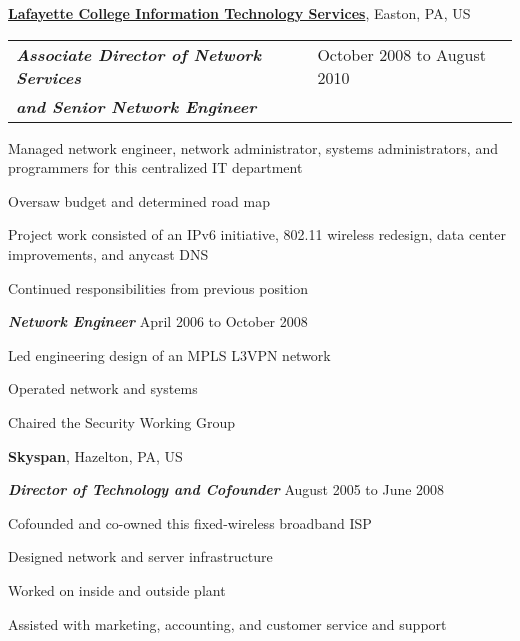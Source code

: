 \documentclass[10pt]{article}
\newenvironment{outerlist}[1][\enskip\textbullet]%
        {\begin{itemize}[#1]}{\end{itemize}%
         \vspace{-.6\baselineskip}}
\newenvironment{innerlist}[1][\enskip\textbullet]%
        {\begin{compactitem}[#1]}{\end{compactitem}}
\newcommand{\blankline}{\quad\pagebreak[2]}
\begin{document}
\href{https://its.lafayette.edu}{\textbf{Lafayette College Information Technology Services}},
Easton, PA, US
\begin{outerlist}
\item[]
  \newlength{\rcoltitlelength}\setlength{\rcoltitlelength}{2.16in}
  \begin{tabular}[t]{@{}p{\textwidth-\rcoltitlelength} p{\rcoltitlelength}}
    \textit{\textbf{Associate Director of Network Services }} &
    October 2008 to August 2010 \\
    \textit{\textbf{and Senior Network Engineer}} & \\
  \end{tabular}
  \begin{innerlist}
  \item Managed network engineer, network administrator, systems administrators, and programmers for this centralized IT department
  \item Oversaw budget and determined road map
  \item Project work consisted of an IPv6 initiative, 802.11 wireless redesign, data center improvements, and anycast DNS
  \item Continued responsibilities from previous position
  \end{innerlist}

\item[] \textit{\textbf{Network Engineer}}
  \hfill April 2006 to October 2008
  \begin{innerlist}
  \item Led engineering design of an MPLS L3VPN network
  \item Operated network and systems
  \item Chaired the Security Working Group
  \end{innerlist}
\end{outerlist}

\blankline

\textbf{Skyspan},
Hazelton, PA, US
\begin{outerlist}
\item[] \textit{\textbf{Director of Technology and Cofounder}}
  \hfill August 2005 to June 2008
  \begin{innerlist}
  \item Cofounded and co-owned this fixed-wireless broadband ISP
  \item Designed network and server infrastructure
  \item Worked on inside and outside plant
  \item Assisted with marketing, accounting, and customer service and support
  \end{innerlist}
\end{outerlist}
\end{document}
